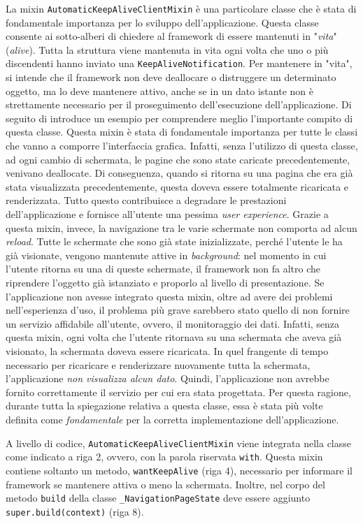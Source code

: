 La mixin \verb|AutomaticKeepAliveClientMixin| \cite{keep_alive_mixin} \cite{keep_alive} è una particolare classe che è stata di fondamentale importanza per lo sviluppo dell'applicazione. Questa classe consente ai sotto-alberi di chiedere al framework di essere mantenuti in "\textit{vita}" (\textit{alive}). Tutta la struttura viene mantenuta in vita ogni volta che uno o più discendenti hanno inviato una \verb|KeepAliveNotification|. Per mantenere in "vita", si intende che il framework non deve deallocare o distruggere un determinato oggetto, ma lo deve mantenere attivo, anche se in un dato istante non è strettamente necessario per il proseguimento dell'esecuzione dell'applicazione. Di seguito di introduce un esempio per comprendere meglio l'importante compito di questa classe. Questa mixin è stata di fondamentale importanza per tutte le classi che vanno a comporre l'interfaccia grafica. Infatti, senza l'utilizzo di questa classe, ad ogni cambio di schermata, le pagine che sono state caricate precedentemente, venivano deallocate. Di conseguenza, quando si ritorna su una pagina che era già stata visualizzata precedentemente, questa doveva essere totalmente ricaricata e renderizzata. Tutto questo contribuisce a degradare le prestazioni dell'applicazione e fornisce all'utente una pessima \textit{user experience}. Grazie a questa mixin, invece, la navigazione tra le varie schermate non comporta ad alcun \textit{reload}. Tutte le schermate che sono già state inizializzate, perché l'utente le ha già visionate, vengono mantenute attive in \textit{background}: nel momento in cui l'utente ritorna su una di queste schermate, il framework non fa altro che riprendere l'oggetto già istanziato e proporlo al livello di presentazione. Se l'applicazione non avesse integrato questa mixin, oltre ad avere dei problemi nell'esperienza d'uso, il problema più grave sarebbero stato quello di non fornire un servizio affidabile all'utente, ovvero, il monitoraggio dei dati. Infatti, senza questa mixin, ogni volta che l'utente ritornava su una schermata che aveva già visionato, la schermata doveva essere ricaricata. In quel frangente di tempo necessario per ricaricare e renderizzare nuovamente tutta la schermata, l'applicazione \textit{non visualizza alcun dato}. Quindi, l'applicazione non avrebbe fornito correttamente il servizio per cui era stata progettata. Per questa ragione, durante tutta la spiegazione relativa a questa classe, essa è stata più volte definita come \textit{fondamentale} per la corretta implementazione dell'applicazione.

A livello di codice, \verb|AutomaticKeepAliveClientMixin| viene integrata nella classe come indicato a riga 2, ovvero, con la parola riservata \verb|with|. Questa mixin contiene soltanto un metodo, \verb|wantKeepAlive| (riga 4), necessario per informare il framework se mantenere attiva o meno la schermata. Inoltre, nel corpo del metodo \verb|build| della classe \verb|_NavigationPageState| deve essere aggiunto \verb|super.build(context)| \cite{keep_alive_mixin} (riga 8).


